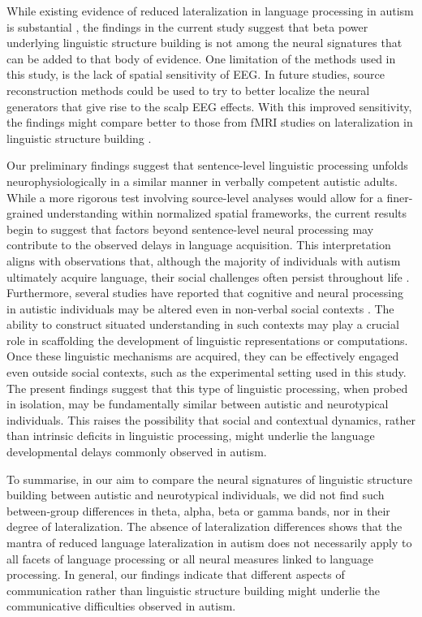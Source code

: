While existing evidence of reduced lateralization in language processing in autism is substantial \citep{lindell2013}, the findings in the current study suggest that beta power underlying linguistic structure building is not among the neural signatures that can be added to that body of evidence. One limitation of the methods used in this study, is the lack of spatial sensitivity of EEG. In future studies, source reconstruction methods could be used to try to better localize the neural generators that give rise to the scalp EEG effects. With this improved sensitivity, the findings might compare better to those from fMRI studies on lateralization in linguistic structure building \citep{jouravlev2020}.

Our preliminary findings suggest that sentence-level linguistic processing unfolds neurophysiologically in a similar manner in verbally competent autistic adults. While a more rigorous test involving source-level analyses would allow for a finer-grained understanding within normalized spatial frameworks, the current results begin to suggest that factors beyond sentence-level neural processing may contribute to the observed delays in language acquisition. This interpretation aligns with observations that, although the majority of individuals with autism ultimately acquire language, their social challenges often persist throughout life \citep{anderson2007}. Furthermore, several studies have reported that cognitive and neural processing in autistic individuals may be altered even in non-verbal social contexts \citep{mangnus2024bpcnni,wadge2019}. The ability to construct situated understanding in such contexts may play a crucial role in scaffolding the development of linguistic representations or computations. Once these linguistic mechanisms are acquired, they can be effectively engaged even outside social contexts, such as the experimental setting used in this study. The present findings suggest that this type of linguistic processing, when probed in isolation, may be fundamentally similar between autistic and neurotypical individuals. This raises the possibility that social and contextual dynamics, rather than intrinsic deficits in linguistic processing, might underlie the language developmental delays commonly observed in autism. 

To summarise, in our aim to compare the neural signatures of linguistic structure building between autistic and neurotypical individuals, we did not find such between-group differences in theta, alpha, beta or gamma bands, nor in their degree of lateralization. The absence of lateralization differences shows that the mantra of reduced language lateralization in autism does not necessarily apply to all facets of language processing or all neural measures linked to language processing. In general, our findings indicate that different aspects of communication rather than linguistic structure building might underlie the communicative difficulties observed in autism.


